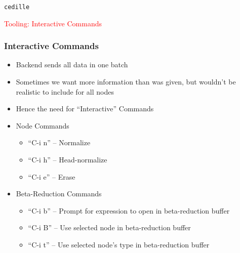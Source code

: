 \documentclass[11pt]{beamer}
\date{\ }
\begin{document}

\begin{frame}

\begin{center}

{\Huge \texttt{cedille}}

\vspace{1cm}

{\Large \textcolor{red}{Tooling: Interactive Commands}}

\end{center}

\end{frame}




\begin{frame}
\frametitle{Interactive Commands}
\begin{itemize}
\item Backend sends all data in one batch
\pause
\item Sometimes we want more information than was given, but wouldn't be realistic to include for all nodes
\pause
\item Hence the need for ``Interactive'' Commands
\pause
\item Node Commands
\pause
\begin{itemize}
\item ``C-i n'' -- Normalize
\pause
\item ``C-i h'' -- Head-normalize
\pause
\item ``C-i e'' -- Erase
\end{itemize}
\pause
\item Beta-Reduction Commands
\pause
\begin{itemize}
\item ``C-i b'' -- Prompt for expression to open in beta-reduction buffer
\pause
\item ``C-i B'' -- Use selected node in beta-reduction buffer
\pause
\item ``C-i t'' -- Use selected node's type in beta-reduction buffer
\pause
\end{itemize}

\end{itemize}

\end{frame}
\end{document}
